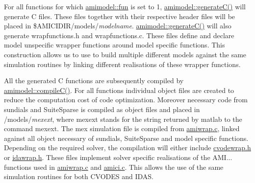 For all functions for which \hyperlink{classamimodel_a743fa290dbc0a67a3843d5ab0426e9b4}{amimodel\+::fun} is set to 1, \hyperlink{classamimodel_af2ce5001c2320c95471ecb8c3d73bdbb}{amimodel\+::generate\+C()} will generate C files. These files together with their respective header files will be placed in \$\+A\+M\+I\+C\+I\+D\+I\+R/models/{\itshape modelname}. \hyperlink{classamimodel_af2ce5001c2320c95471ecb8c3d73bdbb}{amimodel\+::generate\+C()} will also generate wrapfunctions.\+h and wrapfunctions.\+c. These files define and declare model unspecific wrapper functions around model specific functions. This construction allows us to use to build multiple different models against the same simulation routines by linking different realisations of these wrapper functions.

All the generated C functions are subsequently compiled by \hyperlink{classamimodel_ad1339463ebc3a2e6c6aeda6f63f1b4ed}{amimodel\+::compile\+C()}. For all functions individual object files are created to reduce the computation cost of code optimization. Moreover necessary code from sundials and Suite\+Sparse is compiled as object files and placed in /models/{\itshape mexext}, where mexext stands for the string returned by matlab to the command mexext. The mex simulation file is compiled from \hyperlink{amiwrap_8c}{amiwrap.\+c}, linked against all object necessary of sundials, Suite\+Sparse and model specific functions. Depending on the required solver, the compilation will either include \hyperlink{cvodewrap_8h_source}{cvodewrap.\+h} or \hyperlink{idawrap_8h_source}{idawrap.\+h}. These files implement solver specific realisations of the A\+M\+I... functions used in \hyperlink{amiwrap_8c}{amiwrap.\+c} and \hyperlink{amici_8c}{amici.\+c}. This allows the use of the same simulation routines for both C\+V\+O\+D\+E\+S and I\+D\+A\+S. 